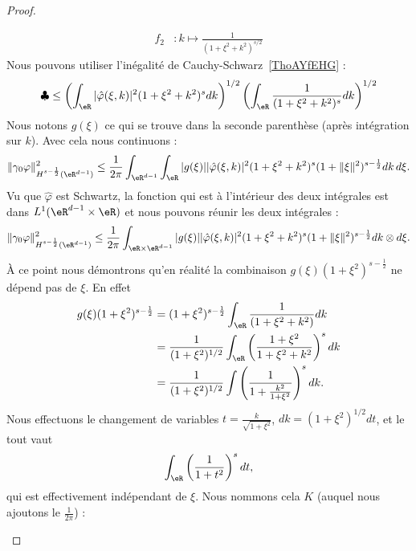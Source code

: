 \begin{proof}
\begin{subproof}
\begin{subequations}
\begin{align}
				f_2 & \colon k\mapsto \frac{1}{ (1+\xi^2+k^2)^{s/2} }
			\end{align}
		\end{subequations}
		Nous pouvons utiliser l'inégalité de Cauchy-Schwarz~\ref{ThoAYfEHG} :
		\begin{equation}
			\clubsuit\leq \left( \int_{\eR}| \hat \varphi(\xi,k) |^2(1+\xi^2+k^2)^sdk \right)^{1/2}\left( \int_{\eR}\frac{1}{ (1+\xi^2+k^2)^s }dk \right)^{1/2}
		\end{equation}
		Nous notons \( g(\xi)\) ce qui se trouve dans la seconde parenthèse (après intégration sur \( k\)). Avec cela nous continuons :
		\begin{equation}
			\| \gamma_0\varphi \|^2_{H^{s-\frac{ 1 }{2}}(\eR^{d-1})}\leq\frac{1}{ 2\pi }\int_{\eR^{d-1}}\int_{\eR}| g(\xi) | |\hat \varphi(\xi,k) |^2(1+\xi^2+k^2)^s(1+\| \xi \|^2)^{s-\frac{ 1 }{2}}dk\,d\xi.
		\end{equation}
		Vu que \( \hat \varphi\) est Schwartz, la fonction qui est à l'intérieur des deux intégrales est dans \( L^1(\eR^{d-1}\times \eR)\) et nous pouvons réunir les deux intégrales :
		\begin{equation}
			\| \gamma_0\varphi \|^2_{H^{s-\frac{ 1 }{2}}(\eR^{d-1})}\leq\frac{1}{ 2\pi }\int_{\eR\times \eR^{d-1}}| g(\xi) | |\hat \varphi(\xi,k) |^2(1+\xi^2+k^2)^s(1+\| \xi \|^2)^{s-\frac{ 1 }{2}}dk\otimes d\xi.
		\end{equation}
		À ce point nous démontrons qu'en réalité la combinaison \( g(\xi)(1+\xi^2)^{s-\frac{ 1 }{2}}\) ne dépend pas de \( \xi\). En effet
		\begin{subequations}
			\begin{align}
				g(\xi)(1+\xi^2)^{s-\frac{ 1 }{2}} & =(1+\xi^2)^{s-\frac{ 1 }{2}}\int_{\eR}\frac{1}{ (1+\xi^2+k^2) }dk                         \\
				                                  & =\frac{1}{ (1+\xi^2)^{1/2} }\int_{\eR}\left( \frac{ 1+\xi^2 }{ 1+\xi^2+k^2 } \right)^sdk  \\
				                                  & =\frac{1}{ (1+\xi^2)^{1/2} }\int\left( \frac{1}{ 1+\frac{ k^2 }{ 1+\xi^2 } } \right)^sdk.
			\end{align}
		\end{subequations}
		Nous effectuons le changement de variables \( t=\frac{ k }{ \sqrt{ 1+\xi^2 } }\), \( dk=(1+\xi^2)^{1/2}dt\), et le tout vaut
		\begin{equation}
			\int_{\eR}\left( \frac{1}{ 1+t^2 } \right)^sdt,
		\end{equation}
		qui est effectivement indépendant de \( \xi\). Nous nommons cela \( K\) (auquel nous ajoutons le \( \frac{1}{ 2\pi }\)) :

\end{subproof}
\end{proof}
